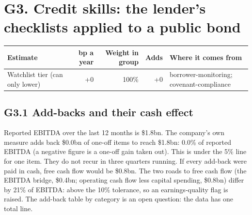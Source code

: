 \documentclass[11pt,a4paper]{article}
\begin{document}
\section*{G3. Credit skills: the lender's checklists applied to a public bond}
\par\noindent{}
\begin{center}\footnotesize\setlength{\tabcolsep}{3.5pt}\begin{tabular}{@{}p{6.2cm}rrrp{4.2cm}@{}}\toprule
Estimate & bp a year & Weight in group & Adds & Where it comes from \\\midrule
Watchlist tier (can only lower) & +0 & 100\% & +0 & borrower-monitoring; covenant-compliance \\
\bottomrule\end{tabular}\end{center}
\subsection*{G3.1 Add-backs and their cash effect}
Reported EBITDA over the last 12 months is \$1.8bn. The company's own measure adds back \$0.0bn of one-off items to reach \$1.8bn: 0.0\% of reported EBITDA (a negative figure is a one-off gain taken out). This is under the 5\% line for one item. They do not recur in three quarters running. If every add-back were paid in cash, free cash flow would be \$0.8bn. The two roads to free cash flow (the EBITDA bridge, \$0.4bn; operating cash flow less capital spending, \$0.8bn) differ by 21\% of EBITDA: above the 10\% tolerance, so an earnings-quality flag is raised. The add-back table by category is an open question: the data has one total line.
\end{document}
